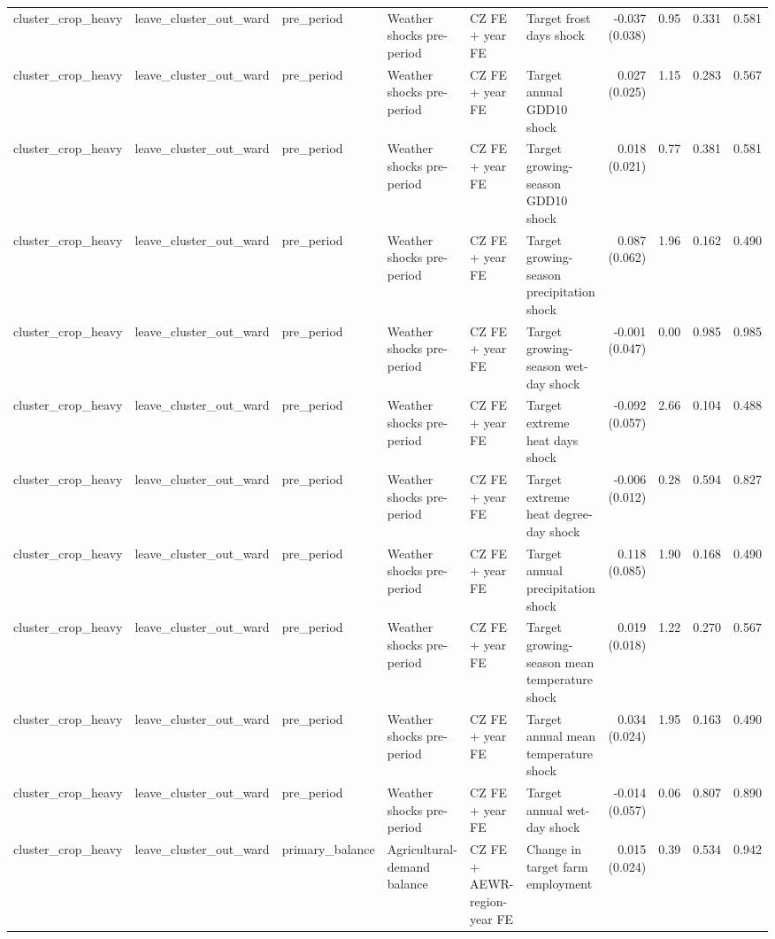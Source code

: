 \begin{tabular}{llllllrrrr}
cluster_crop_heavy & leave_cluster_out_ward & pre_period & Weather shocks pre-period & CZ FE + year FE & Target frost days shock & -0.037 (0.038) & 0.95 & 0.331 & 0.581 \\
cluster_crop_heavy & leave_cluster_out_ward & pre_period & Weather shocks pre-period & CZ FE + year FE & Target annual GDD10 shock & 0.027 (0.025) & 1.15 & 0.283 & 0.567 \\
cluster_crop_heavy & leave_cluster_out_ward & pre_period & Weather shocks pre-period & CZ FE + year FE & Target growing-season GDD10 shock & 0.018 (0.021) & 0.77 & 0.381 & 0.581 \\
cluster_crop_heavy & leave_cluster_out_ward & pre_period & Weather shocks pre-period & CZ FE + year FE & Target growing-season precipitation shock & 0.087 (0.062) & 1.96 & 0.162 & 0.490 \\
cluster_crop_heavy & leave_cluster_out_ward & pre_period & Weather shocks pre-period & CZ FE + year FE & Target growing-season wet-day shock & -0.001 (0.047) & 0.00 & 0.985 & 0.985 \\
cluster_crop_heavy & leave_cluster_out_ward & pre_period & Weather shocks pre-period & CZ FE + year FE & Target extreme heat days shock & -0.092 (0.057) & 2.66 & 0.104 & 0.488 \\
cluster_crop_heavy & leave_cluster_out_ward & pre_period & Weather shocks pre-period & CZ FE + year FE & Target extreme heat degree-day shock & -0.006 (0.012) & 0.28 & 0.594 & 0.827 \\
cluster_crop_heavy & leave_cluster_out_ward & pre_period & Weather shocks pre-period & CZ FE + year FE & Target annual precipitation shock & 0.118 (0.085) & 1.90 & 0.168 & 0.490 \\
cluster_crop_heavy & leave_cluster_out_ward & pre_period & Weather shocks pre-period & CZ FE + year FE & Target growing-season mean temperature shock & 0.019 (0.018) & 1.22 & 0.270 & 0.567 \\
cluster_crop_heavy & leave_cluster_out_ward & pre_period & Weather shocks pre-period & CZ FE + year FE & Target annual mean temperature shock & 0.034 (0.024) & 1.95 & 0.163 & 0.490 \\
cluster_crop_heavy & leave_cluster_out_ward & pre_period & Weather shocks pre-period & CZ FE + year FE & Target annual wet-day shock & -0.014 (0.057) & 0.06 & 0.807 & 0.890 \\
cluster_crop_heavy & leave_cluster_out_ward & primary_balance & Agricultural-demand balance & CZ FE + AEWR-region-year FE & Change in target farm employment & 0.015 (0.024) & 0.39 & 0.534 & 0.942 \\

\end{tabular}
